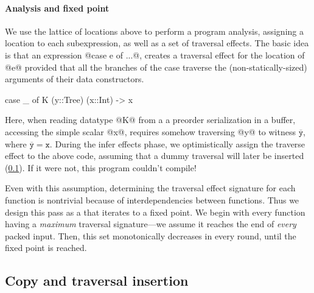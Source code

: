 \documentclass[a4paper,english]{lipics-v2016}
\newcommand{\fixed}[1]{\ensuremath{\texttt{#1}}}
\newcommand{\locend}[1]{\ensuremath{\overline{#1}}}
\begin{document}
\paragraph*{Analysis and fixed point}

We use the lattice of locations above to perform a program analysis, assigning a
location to each subexpression, as well as a set of traversal effects.  The
basic idea is that an expression @case e of ...@, creates a traversal effect for
the location of @e@ provided that all the branches of the case traverse the
(non-statically-sized) arguments of their data constructors.
%
\begin{code}
  case _ of K (y::Tree) (x::Int) -> x
\end{code}
%
Here, when reading datatype @K@ from a a preorder serialization in a buffer,
accessing the simple scalar @x@, requires somehow traversing @y@ to witness
\locend{\fixed{y}}, where $\locend{\fixed{y}} = \fixed{x}$.  During the infer
effects phase, we optimistically assign the traverse effect to the above code,
assuming that a dummy traversal will later be inserted (\cref{sec:copy-insert}).
%
If it were not, this program couldn't compile!


Even with this assumption, determining the traversal effect signature for each
function is nontrivial because of interdependencies between functions.
Thus we design this pass as a  that iterates
to a fixed point.
%
We begin with every function having a {\em maximum} traversal signature---we
assume it reaches the end of {\em every} packed input. Then, this set
monotonically decreases in every round, until the fixed point is reached.

\subsection{Copy and traversal insertion}\label{sec:copy-insert}
\end{document}
